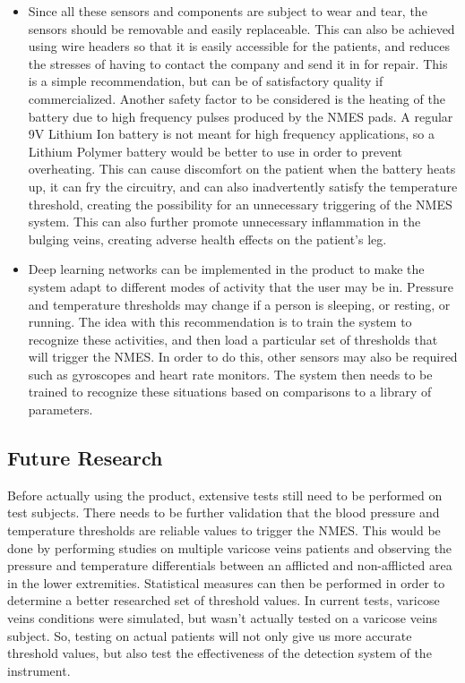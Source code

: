 \documentclass[11.5pt]{article}
\begin{document}
\begin{itemize}
    \item Since all these sensors and components are subject to wear and tear, the sensors should be removable and easily replaceable. This can also be achieved using wire headers so that it is easily accessible for the patients, and reduces the stresses of having to contact the company and send it in for repair. This is a simple recommendation, but can be of satisfactory quality if commercialized. Another safety factor to be considered is the heating of the battery due to high frequency pulses produced by the NMES pads. A regular 9V Lithium Ion battery is not meant for high frequency applications, so a Lithium Polymer battery would be better to use in order to prevent overheating. This can cause discomfort on the patient when the battery heats up, it can fry the circuitry, and can also inadvertently satisfy the temperature threshold, creating the possibility for an unnecessary triggering of the NMES system. This can also further promote unnecessary inflammation in the bulging veins, creating adverse health effects on the patient's leg. 
    \item Deep learning networks can be implemented in the product to make the system adapt to different modes of activity that the user may be in. Pressure and temperature thresholds may change if a person is sleeping, or resting, or running. The idea with this recommendation is to train the system to recognize these activities, and then load a particular set of thresholds that will trigger the NMES. In order to do this, other sensors may also be required such as gyroscopes and heart rate monitors. The system then needs to be trained to recognize these situations based on comparisons to a library of parameters. 
\end{itemize}

\subsection{Future Research}
Before actually using the product, extensive tests still need to be performed on test subjects. There needs to be further validation that the blood pressure and temperature thresholds are reliable values to trigger the NMES. This would be done by performing studies on multiple varicose veins patients and observing the pressure and temperature differentials between an afflicted and non-afflicted area in the lower extremities. Statistical measures can then be performed in order to determine a better researched set of  threshold values. In current tests, varicose veins conditions were simulated, but wasn't actually tested on a varicose veins subject. So, testing on actual patients will not only give us more accurate threshold values, but also test the effectiveness of the detection system of the instrument. \\
\end{document}
